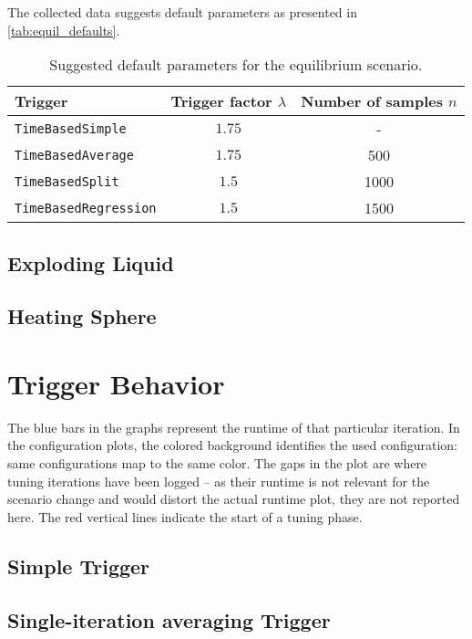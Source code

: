 The collected data suggests default parameters as presented in \autoref{tab:equil_defaults}.
\begin{table}[htpb]
	\centering
	\begin{tabular}{lcc}
		\toprule
		\textbf{Trigger}                      & \textbf{Trigger factor $\lambda$} & \textbf{Number of samples $n$} \\ [0em]
		\midrule
		\texttt{TimeBasedSimple}     & $1.75$                   & -                     \\
		\texttt{TimeBasedAverage}    & $1.75$                   & 500                   \\
		\texttt{TimeBasedSplit}      & $1.5$                    & 1000                  \\
		\texttt{TimeBasedRegression} & $1.5$                    & 1500                  \\
		\bottomrule
	\end{tabular}
	\caption{Suggested default parameters for the equilibrium scenario.}
	\label{tab:equil_defaults}
\end{table}

\subsection{Exploding Liquid}
\subsection{Heating Sphere}

\section{Trigger Behavior}
The blue bars in the graphs represent the runtime of that particular iteration.
In the configuration plots, the colored background identifies the used configuration: same configurations map to the same color. The gaps in the plot are where tuning iterations have been logged -- as their runtime is not relevant for the scenario change and would distort the actual runtime plot, they are not reported here. The red vertical lines indicate the start of a tuning phase.

\subsection{Simple Trigger}
\subsection{Single-iteration averaging Trigger}

